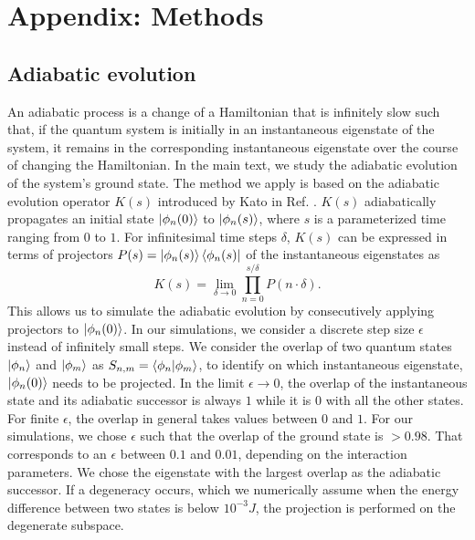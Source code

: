\documentclass[reprint,aps,prb,superscriptaddress,10pt]{revtex4-2} %
\begin{document}
\section{Appendix: Methods}
\subsection{Adiabatic evolution}
An adiabatic process is a change of a Hamiltonian that is infinitely slow such that, if the quantum system is initially in an instantaneous eigenstate of the system, it remains in the corresponding instantaneous eigenstate over the course of changing the Hamiltonian.
In the main text, we study the adiabatic evolution of the system's ground state. 
The method we apply is based on the adiabatic evolution operator $K(s)$ introduced by Kato in Ref. \cite{Kato1950}.
$K(s)$ adiabatically propagates an initial state $\ket{\phi_n(0)}$ to $\ket{\phi_n(s)}$, where $s$ is a parameterized time ranging from $0$ to $1$.
For infinitesimal time steps $\delta$, $K(s)$ can be expressed in terms of projectors $P(s)=\ket{\phi_n(s)}\bra{\phi_n(s)}$ of the instantaneous eigenstates as
\begin{equation}\label{AdaiabticEvol}
K(s)=\lim_{\delta \to 0}\prod_{n=0}^{s/\delta}P(n\cdot\delta).
\end{equation}
This allows us to simulate the adiabatic evolution by consecutively applying projectors to $\ket{\phi_n(0)}$.
In our simulations, we consider a discrete step size $\epsilon$ instead of infinitely small steps. 
We consider the overlap of two quantum states $\ket{\phi_n}$ and $\ket{\phi_m}$ as $S_{n,m} = \braket{\phi_n|\phi_m}$, to identify on which instantaneous eigenstate, $\ket{\phi_n(0)}$ needs to be projected.
In the limit $\epsilon\rightarrow 0$, the overlap of the instantaneous state and its adiabatic successor is always $1$ while it is $0$ with all the other states.
For finite $\epsilon$, the overlap in general takes values between $0$ and $1$. For our simulations, we chose $\epsilon$ such that the overlap of the ground state is $>0.98$. That corresponds to an $\epsilon$ between $0.1$ and $0.01$, depending on the interaction parameters.  We chose the eigenstate with the largest overlap as the adiabatic successor.
If a degeneracy occurs, which we numerically assume when the energy difference between two states is below $10^{-3}J$, the projection is performed on the degenerate subspace.
\end{document}
